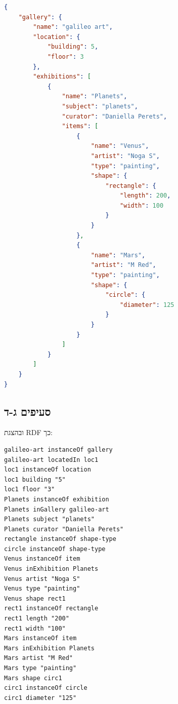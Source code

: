 \documentclass{article}
\begin{document}
\begin{lstlisting}[language=JSON]
    {
    "gallery": {
        "name": "galileo art",
        "location": {
            "building": 5,
            "floor": 3
        },
        "exhibitions": [
            {
                "name": "Planets",
                "subject": "planets",
                "curator": "Daniella Perets",
                "items": [
                    {
                        "name": "Venus",
                        "artist": "Noga S",
                        "type": "painting",
                        "shape": {
                            "rectangle": {
                                "length": 200,
                                "width": 100
                            }
                        }
                    },
                    {
                        "name": "Mars",
                        "artist": "M Red",
                        "type": "painting",
                        "shape": {
                            "circle": {
                                "diameter": 125
                            }
                        }
                    }
                ]
            }
        ]
    }
}
\end{lstlisting}

\pagebreak

\begin{hebrew}
    \subsection*{סעיפים ג-ד}
    ובהצגת RDF כך:
\end{hebrew}

\begin{lstlisting}[language=N3]
galileo-art instanceOf gallery
galileo-art locatedIn loc1
loc1 instanceOf location
loc1 building "5"
loc1 floor "3"
Planets instanceOf exhibition
Planets inGallery galileo-art
Planets subject "planets"
Planets curator "Daniella Perets"
rectangle instanceOf shape-type
circle instanceOf shape-type
Venus instanceOf item
Venus inExhibition Planets
Venus artist "Noga S"
Venus type "painting"
Venus shape rect1
rect1 instanceOf rectangle
rect1 length "200"
rect1 width "100"
Mars instanceOf item
Mars inExhibition Planets
Mars artist "M Red"
Mars type "painting"
Mars shape circ1
circ1 instanceOf circle
circ1 diameter "125"
\end{lstlisting}
\end{document}
